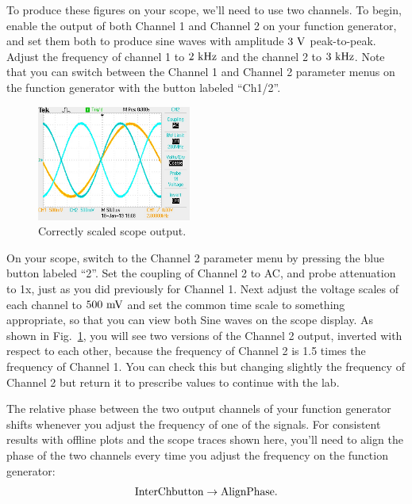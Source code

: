 To produce these figures on your scope, we'll need to use two
channels.  To begin, enable the output of both Channel 1 and Channel 2
on your function generator, and set them both to produce sine waves
with amplitude $3~\rm V$ peak-to-peak.  Adjust the frequency of
channel 1 to $2~\rm kHz$ and the channel 2 to $3~\rm kHz$.  Note that
you can switch between the Channel 1 and Channel 2 parameter menus on the function generator
with the button labeled ``Ch1/2''.

\begin{figure}[htbp]
\begin{center}
\includegraphics[width=0.45\textwidth]{figs/labs/lissajous/two_sine.jpg} 
\caption{Correctly scaled scope output.}
\label{fig:twosine}
\end{center}
\end{figure}

On your scope, switch to the Channel 2 parameter menu by pressing the
blue button labeled ``2''.  Set the coupling of Channel 2 to AC, and
probe attenuation to 1x, just as you did previously for Channel 1.
Next adjust the voltage scales of each channel to $500~\rm mV$ and set
the common time scale to something appropriate, so that you can view
both Sine waves on the scope display.  As shown in Fig.~\ref{fig:twosine},
you will see two versions of the Channel 2 output, inverted with
respect to each other, because the frequency of Channel 2 is 1.5 times
the frequency of Channel 1. You can check this but changing slightly the frequency of 
Channel 2 but return it to prescribe values to continue with the lab.

The relative phase between the two output channels of your function
generator shifts whenever you adjust the frequency of one of the
signals.  For consistent results with offline plots and the scope
traces shown here, you'll need to align the phase of the two channels
every time you adjust the frequency on the function generator:
\begin{displaymath}
\rm Inter Ch button \to AlignPhase.
\end{displaymath}


